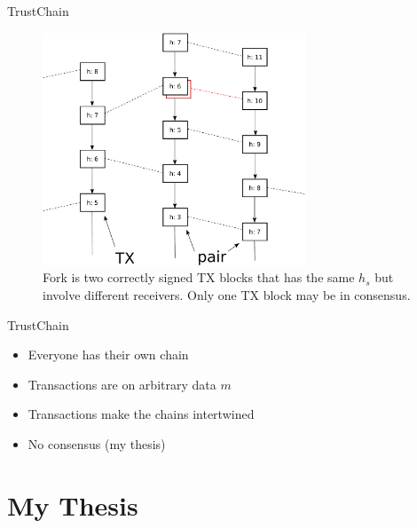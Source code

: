\documentclass{beamer}
\begin{document}
\begin{frame}{TrustChain}{}

  \begin{figure}[h]
  \includegraphics[width=0.7\textwidth]{figures/trustchain-bad}
  \centering
  \caption{Fork is two correctly signed TX blocks that has the same $h_s$ but
    involve different receivers. Only one TX block may be in consensus.}
  \end{figure}

\end{frame}

\begin{frame}{TrustChain}
  \begin{itemize}
    \item Everyone has their own chain
    \item Transactions are on arbitrary data $m$
    \item Transactions make the chains intertwined
    \item No consensus (my thesis)
  \end{itemize}
\end{frame}

\section{My Thesis}
\end{document}
